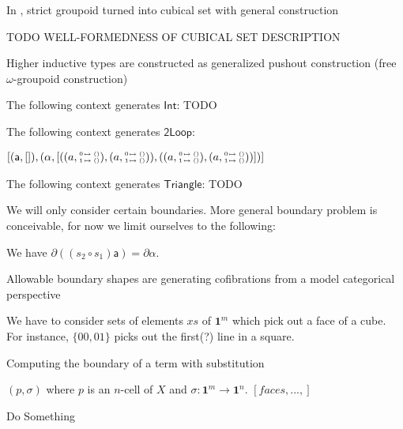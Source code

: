 \documentclass[11pt]{article}
\theoremstyle{definition}
\newcommand{\continuation}{??}
\newenvironment{examplecontd}[1]
{\renewcommand{\continuation}{\ref{#1}}\expcont[continued]}
{\endexpcont}
\newcommand{\pint}[1]{\mathbf{1}^{#1}}
\newcommand{\smap}[1]{s_{{#1}}}
\newcommand{\cset}[1]{\mathsf{{#1}}}
\newcommand{\substtwo}[2]{\tiny
  \arraycolsep=.4pt\def\arraystretch{1}
  \begin{array}{ll}
    0 &\mapsto {#1} \\
    1 &\mapsto {#2}
  \end{array}
}
\newcommand{\constzero}{\substtwo{()}{()}}
\begin{document}
In \cite[Sect. 6.4]{bezem14_model_type_theor_cubic_sets}, strict groupoid turned into
cubical set with general construction

TODO WELL-FORMEDNESS OF CUBICAL SET DESCRIPTION

Higher inductive types are constructed as generalized pushout construction (free
$\omega$-groupoid construction)

\begin{examplecontd}{exp:int}
  The following context generates $\cset{Int}$: TODO
\end{examplecontd}

\begin{examplecontd}{exp:loopspace}
  The following context generates $\cset{2Loop}$:

  $[ (\cset{a},[]) , (\cset{\alpha} , [ ((a, \constzero) , (a, \constzero)) ,
  ((a, \constzero), (a, \constzero)) ])]$
  
\end{examplecontd}

\begin{examplecontd}{exp:triangle}
  The following context generates $\cset{Triangle}$: TODO 
\end{examplecontd}


We will only consider certain boundaries. More general boundary problem is
conceivable, for now we limit ourselves to the following:

We have $\partial ((\smap{2} \circ \smap{1}) \cset{a}) = \partial{\cset{\alpha}}$.


Allowable boundary shapes are generating cofibrations from a model categorical perspective


We have to consider sets of elements $xs$ of $\pint{m}$ which pick out a face of
a cube. For instance, $\{00,01\}$ picks out the first(?) line in a square.

\begin{algorithm}[H]
  \caption{Computing the boundary of a term with substitution}\label{alg:boundary}
  \begin{algorithmic}
    \Require $(p, \sigma)$ where $p$ is an $n$-cell of $X$ and $\sigma : \pint{m} \to \pint{n}$.
    \Ensure $[faces , ... , ]$
    
    \State Do Something
    \EndProcedure
  \end{algorithmic}
\end{algorithm}
\end{document}
